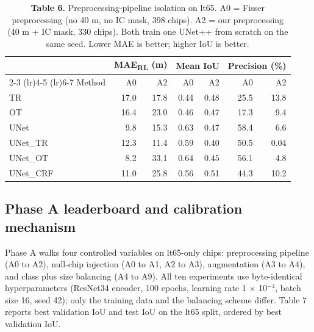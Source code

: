 \documentclass[review,jog]{igs}
\begin{document}
\begin{table}[h]
\caption{\textbf{Table 6.} Preprocessing-pipeline isolation on lt65. A0 = Fisser preprocessing (no 40 m, no IC mask, 398 chips). A2 = our preprocessing (40 m + IC mask, 330 chips). Both train one UNet++ from scratch on the same seed. Lower MAE is better; higher IoU is better.}
\centering
\begin{tabular}{l rr rr rr}
\toprule
       & \multicolumn{2}{c}{MAE\textsubscript{RL} (m)} & \multicolumn{2}{c}{Mean IoU} & \multicolumn{2}{c}{Precision (\%)} \\
\cmidrule(lr){2-3} \cmidrule(lr){4-5} \cmidrule(lr){6-7}
Method & A0 & A2 & A0 & A2 & A0 & A2 \\
\midrule
TR        & 17.0 & 17.8 & 0.44 & 0.48 & 25.5 & 13.8 \\
OT        & 16.4 & 23.0 & 0.46 & 0.47 & 17.3 &  9.4 \\
UNet      &  9.8 & 15.3 & 0.63 & 0.47 & 58.4 &  6.6 \\
UNet\_TR  & 12.3 & 11.4 & 0.59 & 0.40 & 50.5 &  0.04 \\
UNet\_OT  &  8.2 & 33.1 & 0.64 & 0.45 & 56.1 &  4.8 \\
UNet\_CRF & 11.0 & 25.8 & 0.56 & 0.51 & 44.3 & 10.2 \\
\bottomrule
\end{tabular}
\end{table}

\subsection{Phase A leaderboard and calibration mechanism}

Phase A walks four controlled variables on lt65-only chips: preprocessing pipeline (A0 to A2), null-chip injection (A0 to A1, A2 to A3), augmentation (A3 to A4), and class plus size balancing (A4 to A9). All ten experiments use byte-identical hyperparameters (ResNet34 encoder, 100 epochs, learning rate 1 $\times$ 10$^{-4}$, batch size 16, seed 42); only the training data and the balancing scheme differ. Table 7 reports best validation IoU and test IoU on the lt65 split, ordered by best validation IoU.
\end{document}
